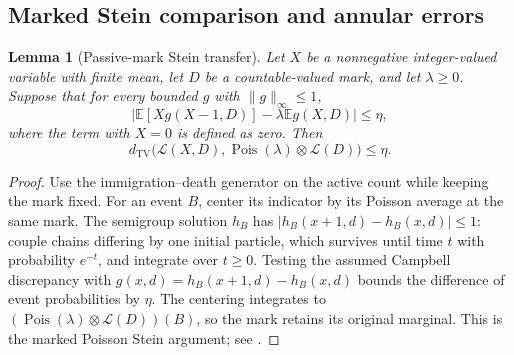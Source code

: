 \documentclass[11pt]{article}
\numberwithin{equation}{section}
\newcommand{\E}{\mathbb E}
\newcommand{\Pois}{\operatorname{Pois}}
\newcommand{\TV}{d_{\mathrm{TV}}}
\newcommand{\cL}{\mathcal L}
\newtheorem{lemma}[theorem]{Lemma}
\theoremstyle{definition}
\theoremstyle{remark}
\begin{document}
\subsection{Marked Stein comparison and annular errors}

\begin{lemma}[Passive-mark Stein transfer]\label{lem:passive-stein}
Let $X$ be a nonnegative integer-valued variable with finite mean, let $D$
be a countable-valued mark, and let $\lambda\ge0$.  Suppose that for every
bounded $g$ with $\|g\|_\infty\le1$,
\[
 \left|\E[Xg(X-1,D)]-\lambda\E g(X,D)\right|\le\eta,
\]
where the term with $X=0$ is defined as zero.  Then
\[
 \TV\bigl(\cL(X,D),\Pois(\lambda)\otimes\cL(D)\bigr)\le\eta.
\]
\end{lemma}
\begin{proof}
Use the immigration--death generator on the active count while keeping the
mark fixed.  For an event $B$, center its indicator by its Poisson average
at the same mark.  The semigroup solution $h_B$ has
$|h_B(x+1,d)-h_B(x,d)|\le1$: couple chains differing by one initial
particle, which survives until time $t$ with probability $e^{-t}$, and
integrate over $t\ge0$.  Testing the assumed Campbell discrepancy with
$g(x,d)=h_B(x+1,d)-h_B(x,d)$ bounds the difference of event probabilities
by $\eta$.  The centering integrates to
$(\Pois(\lambda)\otimes\cL(D))(B)$, so the mark retains its original
marginal.  This is the marked Poisson Stein argument; see
\cite{BarbourHolstJanson1992,LongTotalCycles2026}.
\end{proof}
\end{document}
